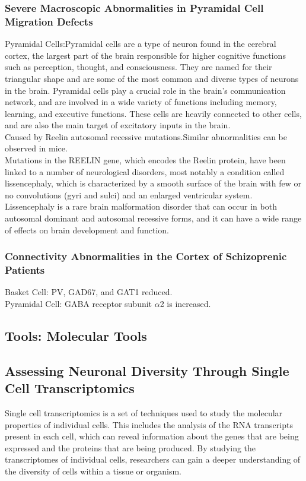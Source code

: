 \begin{itemize}
\begin{itemize}
\subsubsection{Severe Macroscopic Abnormalities in Pyramidal Cell Migration Defects}
Pyramidal Cells:Pyramidal cells are a type of neuron found in the cerebral cortex, the largest part of the brain responsible for higher cognitive functions such as perception, thought, and consciousness. They are named for their triangular shape and are some of the most common and diverse types of neurons in the brain. Pyramidal cells play a crucial role in the brain's communication network, and are involved in a wide variety of functions including memory, learning, and executive functions. These cells are heavily connected to other cells, and are also the main target of excitatory inputs in the brain.
\\Caused by Reelin autosomal recessive mutations.Similar abnormalities can be observed in mice.
\\Mutations in the REELIN gene, which encodes the Reelin protein, have been linked to a number of neurological disorders, most notably a condition called lissencephaly, which is characterized by a smooth surface of the brain with few or no convolutions (gyri and sulci) and an enlarged ventricular system. Lissencephaly is a rare brain malformation disorder that can occur in both autosomal dominant and autosomal recessive forms, and it can have a wide range of effects on brain development and function.
\subsubsection{Connectivity Abnormalities in the Cortex of Schizoprenic Patients}
Basket Cell: PV, GAD67, and GAT1 reduced. 
\\Pyramidal Cell: GABA receptor subunit $\alpha$2 is increased.

\subsection{Tools: Molecular Tools}
\subsection{Assessing Neuronal Diversity Through Single Cell Transcriptomics}

Single cell transcriptomics is a set of techniques used to study the molecular properties of individual cells. This includes the analysis of the RNA transcripts present in each cell, which can reveal information about the genes that are being expressed and the proteins that are being produced. By studying the transcriptomes of individual cells, researchers can gain a deeper understanding of the diversity of cells within a tissue or organism.


\end{itemize}
\end{itemize}
